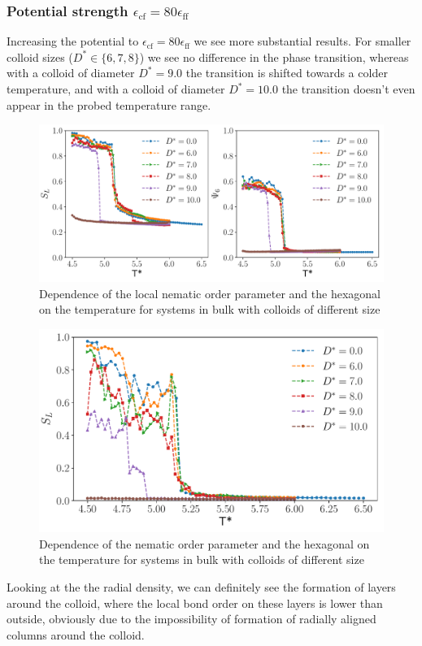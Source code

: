 \subsubsection{Potential strength $\epsilon_{\text{cf}}= 80\epsilon_{\text{ff}}$}
Increasing the potential to $\epsilon_{\text{cf}}= 80\epsilon_{\text{ff}}$ we see more substantial results. For smaller colloid sizes ($D^*\in \{6,7,8\}$) we see no difference in the phase transition, whereas with a colloid of diameter $D^*=9.0$ the transition is shifted towards a colder temperature, and with a colloid of diameter $D^*=10.0$ the transition doesn't even appear in the probed temperature range.
\begin{figure}[H]
    \centering
	\includegraphics[width=\linewidth]{plots/bfo_C80_nemhex.pdf}
	\caption{Dependence of the local nematic order parameter and the hexagonal on the temperature for systems in bulk with colloids of different size}
    \label{fig:beoc32lochex}
\end{figure}
\begin{figure}[H]
    \centering
	\includegraphics[width=0.7\linewidth]{plots/bfo_C80_nemsca.pdf}
	\caption{Dependence of the nematic order parameter and the hexagonal on the temperature for systems in bulk with colloids of different size}
    \label{fig:beoc32lochex}
\end{figure}

Looking at the the radial density, we can definitely see the formation of layers around the colloid, where the local bond order on these layers is lower than outside, obviously due to the impossibility of formation of radially aligned columns around the colloid.


